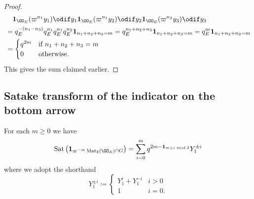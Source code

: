 \begin{proof}
\begin{align*}
    &\quad \mathbf{1}_{\OO_E}(\varpi^{n_1} y_1) \odif y_1
      \mathbf{1}_{\OO_E}(\varpi^{n_1} y_2) \odif y_2
     \mathbf{1}_{\OO_E}(\varpi^{n_2} y_3) \odif y_3 \\
    &= q_E^{-(n_1-n_3)} q_E^{n_1} q_E^{n_1} q_E^{n_2} \mathbf{1}_{n_1+n_2+n_3=m}
    = q_E^{n_1+n_2+n_3}\mathbf{1}_{n_1+n_2+n_3=m}
    = q_E^{m}\mathbf{1}_{n_1+n_2+n_3=m} \\
    &= \begin{cases}
      q^{2m} & \text{if }n_1 + n_2 + n_3 = m \\
      0 & \text{otherwise}.
    \end{cases}
  \end{align*}
  This gives the sum claimed earlier.
\end{proof}

\subsection{Satake transform of the indicator on the bottom arrow}
\begin{proposition}
  For each $m \ge 0$ we have
  \[ \Sat\left(\mathbf{1}_{\varpi^{-m} \Mat_3(\OO_E) \cap G}\right)
    = \sum_{i=0}^m q^{2m - \mathbf{1}_{m \equiv i \bmod 2}} Y_1^{\pm i} \]
  where we adopt the shorthand
  \[
    Y_1^{\pm i} \coloneqq
    \begin{cases}
      Y_1^i + Y_1^{-i} & i > 0 \\
      1 & i = 0 .
    \end{cases}
  \]
\end{proposition}
